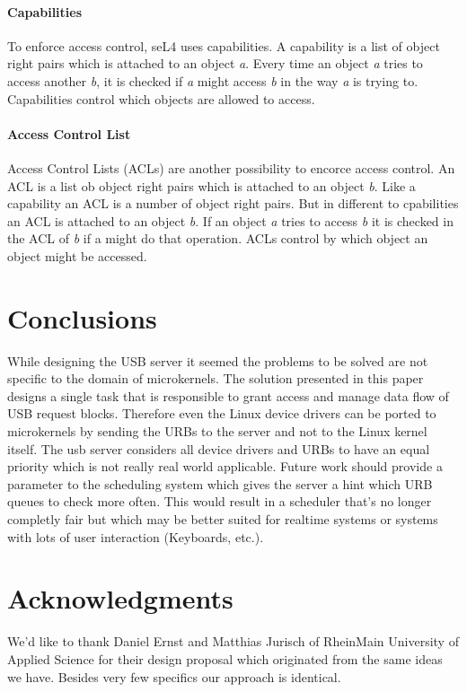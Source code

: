 \documentclass{acm_proc_article-sp}
\begin{document}
\paragraph{Capabilities}
To enforce access control, seL4 uses capabilities.
A capability is a list of object right pairs which is attached to an object \emph{a}.
Every time an object \emph{a}  tries to access another \emph{b}, it is checked if \emph{a} might access \emph{b} in the way \emph{a} is trying to. Capabilities control which objects are allowed to access.

\paragraph{Access Control List}
Access Control Lists (ACLs) are another possibility to encorce access control.
An ACL is a list ob object right pairs which is attached to an object \emph{b}.
Like a capability an ACL is a number of object right pairs. But in different to cpabilities an ACL is attached to an object \emph{b}.
If an object \emph{a} tries to access \emph{b} it is checked in the ACL of \emph{b} if a might do that operation.
ACLs control by which object an object might be accessed.


\section{Conclusions}
While designing the USB server it seemed the problems to be
solved are not specific to the domain of microkernels.
The solution presented in this paper designs a single task
that is responsible to grant access and manage data flow
of USB request blocks.
Therefore even the Linux device drivers can be ported
to microkernels by sending the URBs to the server and not to
the Linux kernel itself.
The usb server considers all device drivers and URBs to have
an equal priority which is not really real world applicable.
Future work should provide a parameter to the scheduling system
which gives the server a hint which URB queues to check
more often.
This would result in a scheduler that's no longer completly
fair but which may be better suited for realtime systems or
systems with lots of user interaction (Keyboards, etc.).

\section{Acknowledgments}
We'd like to thank Daniel Ernst and Matthias Jurisch
of RheinMain University of Applied Science for their design proposal \cite{ernst}
which originated from the same ideas we have.
Besides very few specifics our approach is identical.
\end{document}
